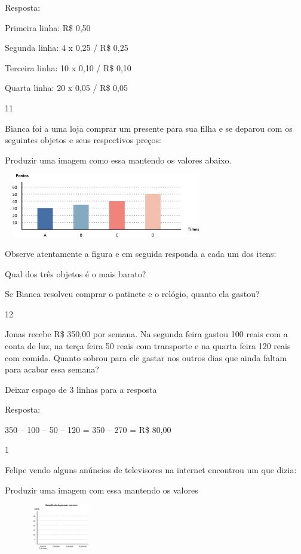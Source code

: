 \begin{escolha}
Resposta:

Primeira linha: R\$ 0,50

Segunda linha: 4 x 0,25 / R\$ 0,25

Terceira linha: 10 x 0,10 / R\$ 0,10

Quarta linha: 20 x 0,05 / R\$ 0,05

\num{11}

Bianca foi a uma loja comprar um presente para sua filha e se deparou
com os seguintes objetos e seus respectivos preços:

Produzir uma imagem como essa mantendo os valores abaixo.

\includegraphics[width=3.51697in,height=1.08343in]{media/image80.png}

Observe atentamente a figura e em seguida responda a cada um dos itens:

\begin{escolha}

\item
  Qual dos três objetos é o mais barato?

\item
  Se Bianca resolveu comprar o patinete e o relógio, quanto ela gastou?

\num{12}

Jonas recebe R\$ 350,00 por semana. Na segunda feira gastou 100 reais
com a conta de luz, na terça feira 50 reais com transporte e na quarta
feira 120 reais com comida. Quanto sobrou para ele gastar nos outros
dias que ainda faltam para acabar essa semana?

Deixar espaço de 3 linhas para a resposta

Resposta:

350 -- 100 -- 50 -- 120 = 350 -- 270 = R\$ 80,00


\num{1}

Felipe vendo alguns anúncios de televisores na internet encontrou um que
dizia:

Produzir uma imagem com essa mantendo os valores

\includegraphics[width=1.95850in,height=0.77507in]{media/image81.png}


\end{escolha}
\end{escolha}
